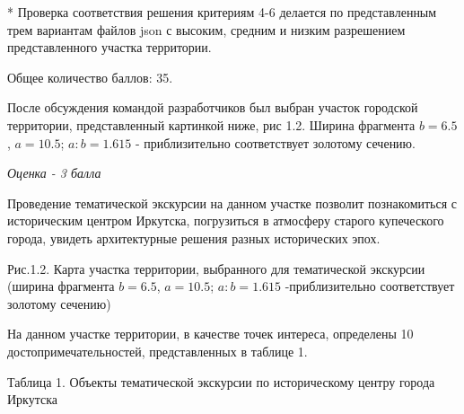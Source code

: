 * Проверка соответствия решения критериям 4-6 делается по представленным трем вариантам файлов json с  высоким, средним и низким  разрешением представленного участка территории.

Общее количество баллов: 35. 

\solutionSection

После обсуждения командой разработчиков был выбран участок городской территории, представленный картинкой ниже, рис 1.2.  Ширина фрагмента $b=6.5$, $a=10.5$; $a:b=1.615$ - приблизительно соответствует золотому сечению. 

\textit{Оценка - 3 балла}

Проведение тематической экскурсии на данном участке позволит познакомиться с историческим центром Иркутска, погрузиться в атмосферу старого купеческого города, увидеть архитектурные решения разных исторических эпох. 


\begin{center}
    Рис.1.2.  Карта участка территории, выбранного для тематической экскурсии (ширина фрагмента $b=6.5$, $a=10.5$; $a:b=1.615$ -приблизительно соответствует золотому сечению)
\end{center}

На данном участке территории, в качестве точек интереса, определены 10 достопримечательностей, представленных в таблице 1.

\begin{center}
    Таблица 1. Объекты тематической экскурсии по историческому центру города Иркутска
\end{center}

